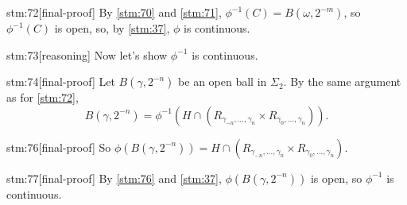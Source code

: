 \documentclass{article}
\begin{document}
\begin{stm}{stm:72}[final-proof]
By \ref{stm:70} and \ref{stm:71}, $\phi^{-1}(C) = B(\omega, 2^{-m})$, so $\phi^{-1}(C)$ is open, so, by \ref{stm:37}, $\phi$ is continuous.
\end{stm}

\begin{stm}{stm:73}[reasoning]
Now let’s show $\phi^{-1}$ is continuous.
\end{stm}

\begin{stm}{stm:74}[final-proof]
Let $B(\gamma, 2^{-n})$ be an open ball in $\Sigma_2$. By the same argument as for \ref{stm:72},
\[
B(\gamma, 2^{-n}) = \phi^{-1}(H \cap (R_{\gamma_{-n}, \ldots, \gamma_n} \times R_{\gamma_0, \ldots, \gamma_n})).
\]
\end{stm}

\begin{stm}{stm:76}[final-proof]
So $\phi(B(\gamma, 2^{-n})) = H \cap (R_{\gamma_{-n}, \ldots, \gamma_n} \times R_{\gamma_0, \ldots, \gamma_n})$.
\end{stm}

\begin{stm}{stm:77}[final-proof]
By \ref{stm:76} and \ref{stm:37}, $\phi(B(\gamma, 2^{-n}))$ is open, so $\phi^{-1}$ is continuous.
\end{stm}
\end{document}
